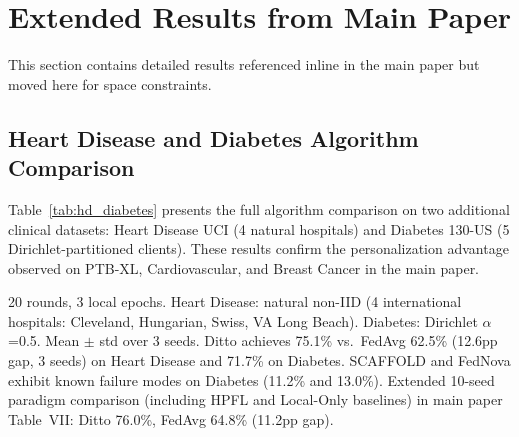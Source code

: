 \documentclass[conference]{IEEEtran}
\begin{document}
\section{Extended Results from Main Paper}
\label{sec:main_extended}

This section contains detailed results referenced inline in the main paper but moved here for space constraints.

\subsection{Heart Disease and Diabetes Algorithm Comparison}

Table~\ref{tab:hd_diabetes} presents the full algorithm comparison on two additional clinical datasets: Heart Disease UCI (4 natural hospitals) and Diabetes 130-US (5 Dirichlet-partitioned clients). These results confirm the personalization advantage observed on PTB-XL, Cardiovascular, and Breast Cancer in the main paper.

\begin{table}[htbp]
\centering
\caption{FL Algorithm Comparison on Heart Disease and Diabetes}
\label{tab:hd_diabetes}

\vspace{1mm}
\footnotesize{20 rounds, 3 local epochs. Heart Disease: natural non-IID (4 international hospitals: Cleveland, Hungarian, Swiss, VA Long Beach). Diabetes: Dirichlet $\alpha$=0.5. Mean $\pm$ std over 3 seeds. Ditto achieves 75.1\% vs.\ FedAvg 62.5\% (12.6pp gap, 3 seeds) on Heart Disease and 71.7\% on Diabetes. SCAFFOLD and FedNova exhibit known failure modes on Diabetes (11.2\% and 13.0\%). Extended 10-seed paradigm comparison (including HPFL and Local-Only baselines) in main paper Table~VII: Ditto 76.0\%, FedAvg 64.8\% (11.2pp gap).}
\end{table}
\end{document}
